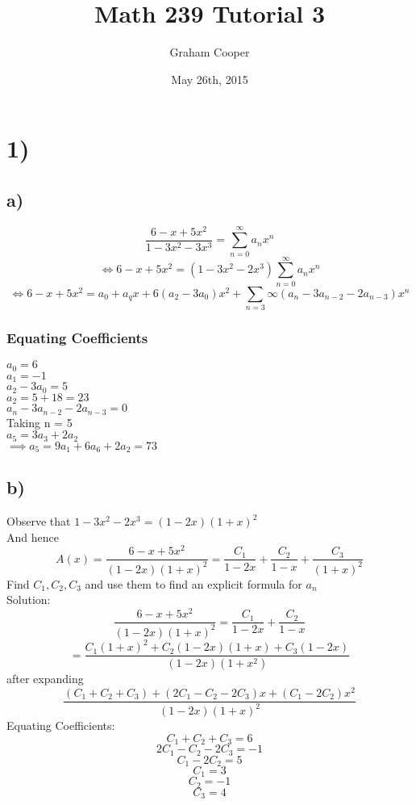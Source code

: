 \documentclass[12pt]{article}
\title{\vspace{-15ex}Math 239 Tutorial 3\vspace{-1ex}}
\date{May 26th, 2015}
\author{Graham Cooper}
\begin{document}
	\maketitle
	
	\section*{1)}
	\subsection*{a)}
	$$\frac{6-x+5x^2}{1-3x^2-3x^3} = \sum_{n=0}^{\infty}a_nx^n$$
	$$\iff 6-x+5x^2 = (1-3x^2-2x^3)\sum_{n=0}^{\infty}a_nx^n$$
	$$\iff 6-x+5x^2 = a_0 + a_qx + 6(a_2 - 3a_0)x^2 + \sum_{n = 3}{\infty}(a_n - 3a_{n-2} - 2a_{n-3})x^n$$
	
	\subsubsection*{Equating Coefficients}
	$a_0 = 6$\\
	$a_1 = -1$\\
	$a_2 - 3a_0 = 5$\\
	$a_2 = 5 + 18 = 23$\\
	$a_n - 3a_{n-2} - 2a_{n-3} = 0$\\
	
	Taking n = 5\\
	$a_5 = 3a_3 + 2a_2$\\
	$\implies a_5 = 9a_1 + 6a_6 + 2a_2 = 73$\\
	
	\subsection*{b)}
	Observe that $1-3x^2 - 2x^3 = (1-2x)(1+x)^2$\\
	
	And hence\\
	
	$$A(x) = \frac{6-x+5x^2}{(1-2x)(1+x)^2} = \frac{C_1}{1-2x} + \frac{C_2}{1-x} + \frac{C_3}{(1+x)^2}$$
	Find $C_1,C_2, C_3$ and use them to find an explicit formula for $a_n$\\
	
	Solution:\\
	$$\frac{6-x+5x^2}{(1-2x)(1+x)^2} = \frac{C_1}{1-2x} + \frac{C_2}{1-x}$$
	$$= \frac{C_1(1+x)^2 + C_2(1-2x)(1+x) + C_3(1-2x)}{(1-2x)(1+x^2)}$$
	after expanding
	$$\frac{(C_1 + C_2 + C_3) + (2C_1 - C_2 - 2C_3)x + (C_1 -2C_2)x^2}{(1-2x)(1+x)^2}$$
	Equating Coefficients:
	$$C_1 + C_2 + C_3 = 6$$
	$$2C_1 - C_2 - 2C_3 = -1$$
	$$C_1 - 2C_2 = 5$$
	$$C_1 = 3$$
	$$C_2 = -1$$
	$$C_3 = 4$$
	
\end{document}
